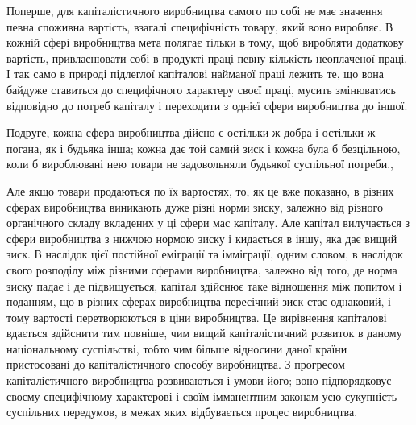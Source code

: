 Поперше, для капіталістичного виробництва самого по собі
не має значення певна споживна вартість, взагалі специфічність
товару, який воно виробляє. В кожній сфері виробництва
мета полягає тільки в тому, щоб виробляти додаткову
вартість, привласнювати собі в продукті праці певну кількість
неоплаченої праці. І так само в природі підлеглої капіталові
найманої праці лежить те, що вона байдуже ставиться до
специфічного характеру своєї праці, мусить змінюватись відповідно
до потреб капіталу і переходити з однієї сфери виробництва
до іншої.

Подруге, кожна сфера виробництва дійсно є остільки ж добра
і остільки ж погана, як і будьяка інша; кожна дає той самий
зиск і кожна була б безцільною, коли б вироблювані нею товари
не задовольняли будьякої суспільної потреби.,

Але якщо товари продаються по їх вартостях, то, як це вже
показано, в різних сферах виробництва виникають дуже різні
норми зиску, залежно від різного органічного складу вкладених
у ці сфери мас капіталу. Але капітал вилучається з сфери виробництва
з нижчою нормою зиску і кидається в іншу, яка дає
вищий зиск. В наслідок цієї постійної еміграції та імміграції,
одним словом, в наслідок свого розподілу між різними сферами
виробництва, залежно від того, де норма зиску падає і де підвищується,
капітал здійснює таке відношення між попитом і поданням,
що в різних сферах виробництва пересічний зиск
стає однаковий, і тому вартості перетворюються в ціни виробництва.
Це вирівнення капіталові вдається здійснити тим повніше,
чим вищий капіталістичний розвиток в даному національному
суспільстві, тобто чим більше відносини даної країни пристосовані
до капіталістичного способу виробництва. З прогресом капіталістичного
виробництва розвиваються і умови його; воно підпорядковує
своєму специфічному характерові і своїм імманентним
законам усю сукупність суспільних передумов, в межах яких
відбувається процес виробництва.

